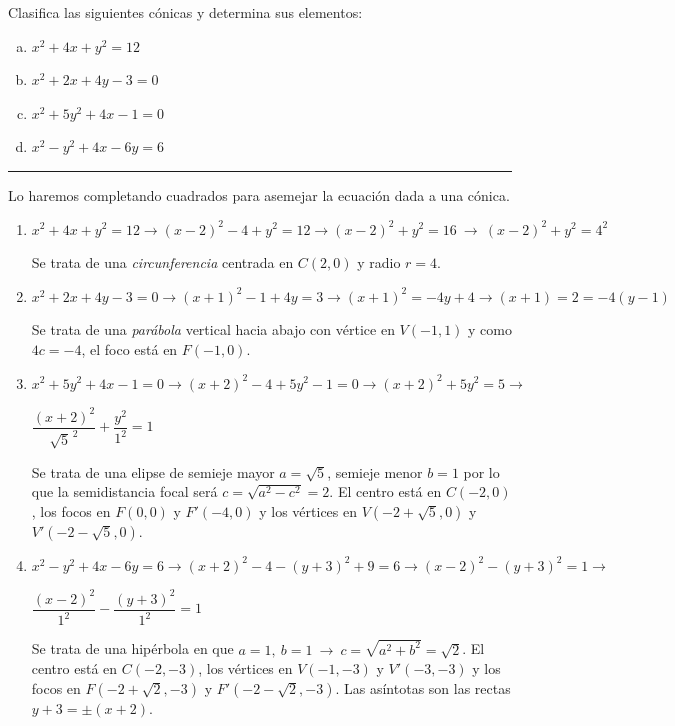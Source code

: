 \begin{miejercicio}

Clasifica las siguientes cónicas y determina sus elementos:

\begin{multicols}{2}
\begin{enumerate}[a) ]
\item $x^2+4x+y^2=12$	
\item $x^2+2x+4y-3=0$
\item $x^2+5y^2+4x-1=0$
\item $x^2-y^2+4x-6y=6$
\end{enumerate}
\end{multicols}	

\rule{250pt}{0.1pt}

\vspace{2mm}
Lo haremos completando cuadrados para asemejar la ecuación dada a una cónica.
\begin{enumerate}[$\triangleright\ \ $ a) ]
\item $x^2+4x+y^2=12 \to (x-2)^2-4+y^2=12 \to (x-2)^2+y^2=16 \ \to \ (x-2)^2+y^2=4^2$

Se trata de una \emph{circunferencia} centrada en $C(2,0)$ y radio $r=4$.

\item $x^2+2x+4y-3=0 \to (x+1)^2-1+4y=3 \to (x+1)^2=-4y+4 \to (x+1)=2=-4(y-1)$

Se trata de una \emph{parábola} vertical hacia abajo con vértice en $V(-1,1)$ y como $4c=-4$, el foco está en $F(-1,0)$.

\item $x^2+5y^2+4x-1=0 \to (x+2)^2-4+5y^2-1=0 \to (x+2)^2+5y^2=5 \to$

$\dfrac{(x+2)^2}{\sqrt{5}^{\, 2}}+\dfrac{y^2}{1^2}=1$

Se trata de una elipse de semieje mayor $a=\sqrt 5$, semieje menor $b=1$ por lo que la semidistancia focal será $c=\sqrt{a^2-c^2}=2$. El centro está en $C(-2,0)$, los focos en $F(0,0)$ y $F'(-4,0)$ y los vértices en $V(-2+\sqrt 5,0)$ y $V'(-2-\sqrt 5,0)$.

\item $x^2-y^2+4x-6y=6 \to (x+2)^2-4-(y+3)^2+9=6 \to (x-2)^2-(y+3)^2=1 \to$

$\dfrac{(x-2)^2}{1^2}-\dfrac{(y+3)^2}{1^2}=1	$

Se trata de una hipérbola en que $a=1,\ b=1 \ \to \ c=\sqrt{a^2+b^2}=\sqrt 2$. El centro está en $C(-2,-3)$, los vértices en $V(-1,-3)$ y $V'(-3,-3)$ y los focos en $F(-2+\sqrt 2,-3)$ y $F'(-2-\sqrt 2,-3)$. Las asíntotas son las rectas $y+3=\pm(x+2)$.
\end{enumerate}
\end{miejercicio}

